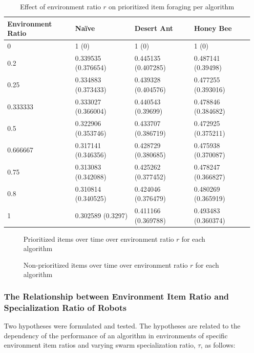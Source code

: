 \begin{table} [h]
    \caption{Effect of environment ratio $r$ on prioritized item foraging per algorithm}
    \label{generalratio}
	\centering
	\footnotesize
	\begin{tabular} {|l|l|l|l|}
		\hline
		Environment Ratio & Na\"ive & Desert Ant & Honey Bee \\
		\hline
		0 & 1 (0)  & 1 (0)  & 1 (0)  \\
		0.2 & 0.339535 (0.376654)  & 0.445135 (0.407285)  & 0.487141 (0.39498)  \\
		0.25 & 0.334883 (0.373433)  & 0.439328 (0.404576)  & 0.477255 (0.393016)  \\
		0.333333 & 0.333027 (0.366004)  & 0.440543 (0.39699)  & 0.478846 (0.384682)  \\
		0.5 & 0.322906 (0.353746)  & 0.433707 (0.386719)  & 0.472925 (0.375211)  \\
		0.666667 & 0.317141 (0.346356)  & 0.428729 (0.380685)  & 0.475938 (0.370087)  \\
		0.75 & 0.313083 (0.342088)  & 0.425262 (0.377452)  & 0.478247 (0.366827)  \\
		0.8 & 0.310814 (0.340525)  & 0.424046 (0.376479)  & 0.480269 (0.365919)  \\
		1 & 0.302589 (0.3297)  & 0.411166 (0.369788)  & 0.493483 (0.360374)  \\
		\hline
	\end{tabular}
\end{table}


\begin{figure}[!htb]
\centering
\resizebox{\textwidth}{!}{}
\caption{Prioritized items over time over environment ratio $r$ for each algorithm }
\label{ratiogoldplot}
\end{figure}


\begin{figure}[!htb]
\centering
\resizebox{\textwidth}{!}{}
\caption{Non-prioritized items over time over environment ratio $r$ for each algorithm}
\label{ratiowasteplot}
\end{figure}


\subsubsection{The Relationship between Environment Item Ratio and Specialization Ratio of Robots}
\label{relationship}
Two hypotheses were formulated and tested. The hypotheses are related to the dependency of the performance of an algorithm in environments of specific environment item ratios and varying swarm specialization ratio, $\tau$, as follows:

